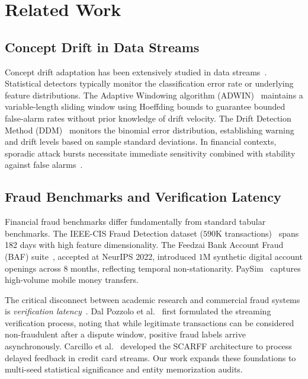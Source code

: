 \documentclass[10pt,conference,compsoc]{IEEEtran}
\begin{document}
\section{Related Work}
\label{sec:related}

\subsection{Concept Drift in Data Streams}
Concept drift adaptation has been extensively studied in data streams~\cite{lu2018learning}. Statistical detectors typically monitor the classification error rate or underlying feature distributions. The Adaptive Windowing algorithm (ADWIN)~\cite{bifet2007learning} maintains a variable-length sliding window using Hoeffding bounds to guarantee bounded false-alarm rates without prior knowledge of drift velocity. The Drift Detection Method (DDM)~\cite{gama2004learning} monitors the binomial error distribution, establishing warning and drift levels based on sample standard deviations. In financial contexts, sporadic attack bursts necessitate immediate sensitivity combined with stability against false alarms~\cite{koh2005finding, koh2010rare}.

\subsection{Fraud Benchmarks and Verification Latency}
Financial fraud benchmarks differ fundamentally from standard tabular benchmarks. The IEEE-CIS Fraud Detection dataset ($590$K transactions)~\cite{ieeecis2019} spans 182 days with high feature dimensionality. The Feedzai Bank Account Fraud (BAF) suite~\cite{jesus2022turning}, accepted at NeurIPS 2022, introduced $1$M synthetic digital account openings across 8 months, reflecting temporal non-stationarity. PaySim~\cite{lopezrojas2016paysim} captures high-volume mobile money transfers.

The critical disconnect between academic research and commercial fraud systems is \textit{verification latency}~\cite{dalpozzolo2015credit}. Dal Pozzolo et al.~\cite{dalpozzolo2015credit} first formulated the streaming verification process, noting that while legitimate transactions can be considered non-fraudulent after a dispute window, positive fraud labels arrive asynchronously. Carcillo et al.~\cite{carcillo2018scarff} developed the SCARFF architecture to process delayed feedback in credit card streams. Our work expands these foundations to multi-seed statistical significance and entity memorization audits.
\end{document}
